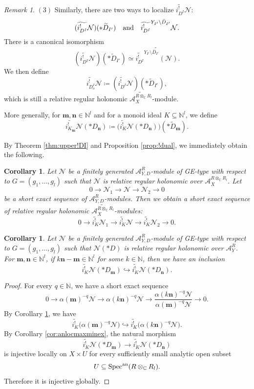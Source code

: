\documentclass{amsart}
\theoremstyle{plain}
\numberwithin{theorem}{section}
\newtheorem{coro}[theorem]{Corollary}
\theoremstyle{definition}
\theoremstyle{remark}
\newtheorem{remark}[theorem]{Remark}
\theoremstyle{definition}
\newcommand{\wt}{\widetilde}
\newcommand{\C}{\mathbb{C}} %
\newcommand{\N}{\mathbb{N}}
\newcommand{\cN}{\mathcal{N}}
\newcommand{\bn}{\mathbf{n}}
\newcommand{\bm}{\mathbf{m}}
\newcommand{\sA}{\mathscr{A}}
\newcommand{\Specan}{\textup{Spec}^{\textup{an}}}
\begin{document}
\begin{remark}
\noindent
$(3)$ Similarly, there are two ways to localize $\wt{i^!_{D^I}}\cN$:
\[
(\wt{i^!_{D^I}}\cN)(*\wt D_{I'})
\quad
\textup{and}
\quad
\wt{i^!_{D^I}}^{Y_{I'}\setminus \bar D_{I'}}\cN.
\]
There is a canonical isomorphism
\[
(\wt{i^!_{D^I}}\cN)(*\wt D_{I'})
\simeq
\widetilde{
\wt{i^!_{D^I}}^{Y_{I'}\setminus \bar D_{I'}}(\cN)
}.
\]
We then define
\[
\wt{i^!_{D_o^I}}\cN
\coloneqq
(\wt{i^!_{D^I}}\cN)(*\wt D_{I^c}),
\]
which is still a relative regular holonomic
$\wt{\sA^{R\otimes_\C R_l}_{X}}$-module.

More generally, for $\bm,\bn\in \N^l$ and for a monoid ideal
$K\subseteq \N^l$, we define
\[
\wt{i^!_{K_\bm}}\cN(*D_\bn)
\coloneqq
\big(\wt{i^!_{K}}\cN(*D_\bn)\big)(*\wt D_{\bm}).
\]
\end{remark}

By Theorem \ref{thm:upper!DI} and Proposition \ref{prop:!dual}, we
immediately obtain the following.

\begin{coro}\label{cor:exactupper!}
Let $\cN$ be a finitely generated $\sA^R_{Y,D}$-module of GE-type with
respect to
$G=(g_1,\dots,g_l)$
such that $\cN$ is relative regular holonomic over
$\sA^{R\otimes_\C R_l}_X$. Let
\[
0\to \cN_1\to \cN\to \cN_2\to 0
\]
be a short exact sequence of $\sA^R_{Y,D}$-modules. Then we obtain a short
exact sequence of relative regular holonomic
$\wt{\sA^{R\otimes_\C R_l}_X}$-modules:
\[
0\to
\wt{i^!_{K}}\cN_1
\to
\wt{i^!_{K}}\cN
\to
\wt{i^!_{K}}\cN_2
\to 0.
\]
\end{coro}

\begin{coro}\label{cor:latticesinc}
Let $\cN$ be a finitely generated $\sA^R_{Y,D}$-module of GE-type with
respect to
$G=(g_1,\dots,g_l)$
such that $\cN(*D)$ is relative regular holonomic over $\sA^R_Y$. For
$\bm,\bn\in \N^l$, if
$k\bn-\bm\in \N^l$
for some $k\in \N$, then we have an inclusion
\[
\wt{i^!_{K}}\cN(*D_\bm)
\hookrightarrow
\wt{i^!_{K}}\cN(*D_\bn).
\]
\end{coro}

\begin{proof}
For every $q\in \N$, we have a short exact sequence
\[
0\to
\alpha(\bm)^{-q}\cN
\to
\alpha(k\bn)^{-q}\cN
\to
\frac{\alpha(k\bn)^{-q}\cN}{\alpha(\bm)^{-q}\cN}
\to 0.
\]
By Corollary \ref{cor:exactupper!}, we have
\[
\wt{i^!_{K}}\big(\alpha(\bm)^{-q}\cN\big)
\hookrightarrow
\wt{i^!_{K}}\big(\alpha(k\bn)^{-q}\cN\big).
\]
By Corollary \ref{cor:anlocmaxminex}, the natural morphism
\[
\wt{i^!_{K}}\cN(*D_\bm)
\longrightarrow
\wt{i^!_{K}}\cN(*D_\bn)
\]
is injective locally on $X\times U$ for every sufficiently small analytic
open subset
\[
U\subseteq \Specan(R\otimes_\C R_l).
\]
Therefore it is injective globally.
\end{proof}
\end{document}
